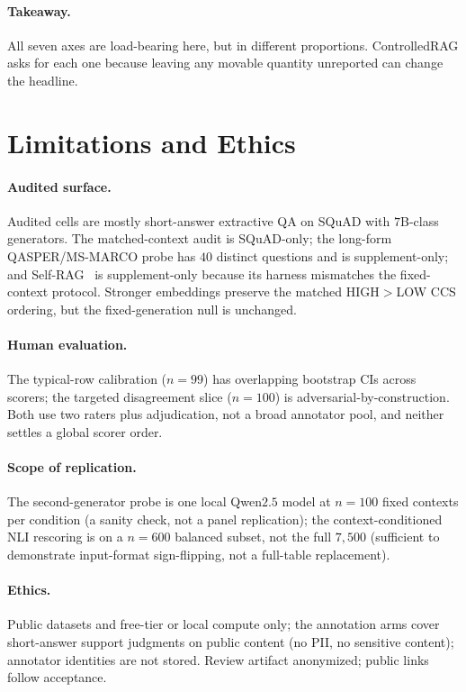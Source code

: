 \paragraph{Takeaway.} All seven axes are load-bearing here, but in
different proportions. ControlledRAG asks for each one because leaving
any movable quantity unreported can change the headline.

\section{Limitations and Ethics}
\label{sec:limits}

\paragraph{Audited surface.} Audited cells are mostly short-answer
extractive QA on SQuAD with $7$B-class generators. The matched-context
audit is SQuAD-only; the long-form QASPER/MS-MARCO probe has $40$
distinct questions and is supplement-only; and
Self-RAG~\citep{asai2024selfrag} is supplement-only because its
harness mismatches the fixed-context protocol. Stronger embeddings
preserve the matched HIGH$>$LOW CCS ordering, but the fixed-generation
null is unchanged.

\paragraph{Human evaluation.} The typical-row calibration ($n=99$)
has overlapping bootstrap CIs across scorers; the targeted
disagreement slice ($n=100$) is adversarial-by-construction. Both use
two raters plus adjudication, not a broad annotator pool, and neither
settles a global scorer order.

\paragraph{Scope of replication.} The second-generator probe is one
local Qwen$2.5$ model at $n=100$ fixed contexts per condition (a
sanity check, not a panel replication); the context-conditioned NLI
rescoring is on a $n=600$ balanced subset, not the full $7{,}500$
(sufficient to demonstrate input-format sign-flipping, not a
full-table replacement).

\paragraph{Ethics.} Public datasets and free-tier or local compute
only; the annotation arms cover short-answer support judgments on
public content (no PII, no sensitive content); annotator identities
are not stored. Review artifact anonymized; public links follow
acceptance.

